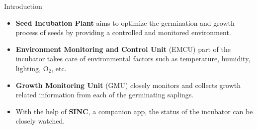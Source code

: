 \documentclass{beamer}
\begin{document}
\maketitle

\begin{frame} {Introduction}

    {
        \begin{minipage} {0.415\textwidth}
            \begin{center}
            \end{center}
        \end{minipage}
        \begin{minipage} {0.55\textwidth}

            \begin{itemize}
                \item \textbf{Seed Incubation Plant} aims to optimize the germination and
                    growth process of seeds by providing a controlled and
                    monitored environment.

                \item \textbf{Environment Monitoring and Control Unit} (EMCU) part of the
                    incubator takes care of environmental factors such as temperature,
                    humidity, lighting, $\mbox{O}_2$, etc.

                \item \textbf{Growth Monitoring Unit} (GMU) closely monitors and collects growth related
                    information from each of the germinating saplings.

                \item With the help of \textbf{SINC}, a companion app, the status of the incubator
                    can be closely watched.
            \end{itemize}

        \end{minipage}
    }

\end{frame}
\end{document}
